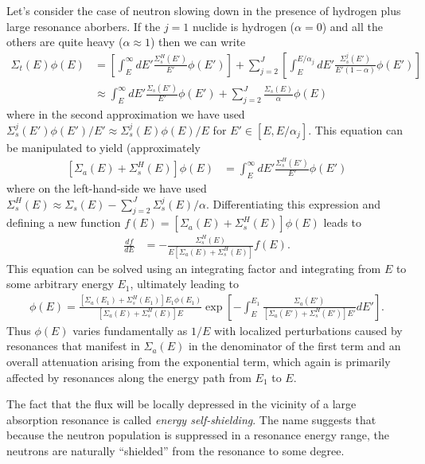 \documentclass[11pt]{article}
\begin{document}
Let's consider the case of neutron slowing down in the presence of hydrogen plus large resonance aborbers.  If the \(j=1\) nuclide is hydrogen (\(\alpha=0\)) and all the others are quite heavy (\(\alpha \approx 1\)) then we can write
\begin{align}
  \Sigma_t(E) \phi(E)
  &=  \left[ \int_E^\infty dE' \frac{\Sigma_s^H(E')}{E'} \phi(E') \right]
    + \sum_{j=2}^J \left[ \int_E^{E/\alpha_j} dE' \frac{\Sigma_s^j(E')}{E'(1-\alpha)} \phi(E') \right] \\
  &\approx  \int_E^\infty dE' \frac{\Sigma_s(E')}{E'} \phi(E')
    + \sum_{j=2}^J \frac{\Sigma_s(E)}{\alpha} \phi(E) 
\end{align}
where in the second approximation we have used \(\Sigma_s^j(E')\phi(E')/E' \approx \Sigma_s^j(E)\phi(E)/E\) for \(E' \in [E, E/\alpha_j]\).  This equation can be manipulated to yield (approximately
\begin{align}
  \left[ \Sigma_a(E) + \Sigma_s^H(E) \right] \phi(E)
  &= \int_E^\infty dE' \frac{\Sigma_s^H(E')}{E'} \phi(E')
\end{align}
where on the left-hand-side we have used \(\Sigma_s^H(E) \approx \Sigma_s(E) - \sum_{j=2}^J \Sigma_s^j(E)/\alpha\).  Differentiating this expression and defining a new function \(f(E) = \left[ \Sigma_a(E) + \Sigma_s^H(E) \right] \phi(E)\) leads to
\begin{align}
  \frac{df}{dE} &= - \frac{\Sigma_s^H(E)}{E\left[ \Sigma_a(E) + \Sigma_s^H(E) \right]} f(E).
\end{align}
This equation can be solved using an integrating factor and integrating from \(E\) to some arbitrary energy \(E_1\), ultimately leading to
\begin{align}
  \phi(E) = \frac{\left[ \Sigma_a(E_1) + \Sigma_s^H(E_1) \right] E_1 \phi(E_1)}{\left[ \Sigma_a(E) + \Sigma_s^H(E) \right] E}
            \exp\left[ -\int_E^{E_1} \frac{\Sigma_a(E')}{\left[ \Sigma_a(E') + \Sigma_s^H(E') \right] E'} dE' \right].
\end{align}
Thus \(\phi(E)\) varies fundamentally as \(1/E\) with localized perturbations caused by resonances that manifest in \(\Sigma_a(E)\) in the denominator of the first term and an overall attenuation arising from the exponential term, which again is primarily affected by resonances along the energy path from \(E_1\) to \(E\).

The fact that the flux will be locally depressed in the vicinity of a large absorption resonance is called \emph{energy self-shielding}.  The name suggests that because the neutron population is suppressed in a resonance energy range, the neutrons are naturally ``shielded'' from the resonance to some degree.
\end{document}
